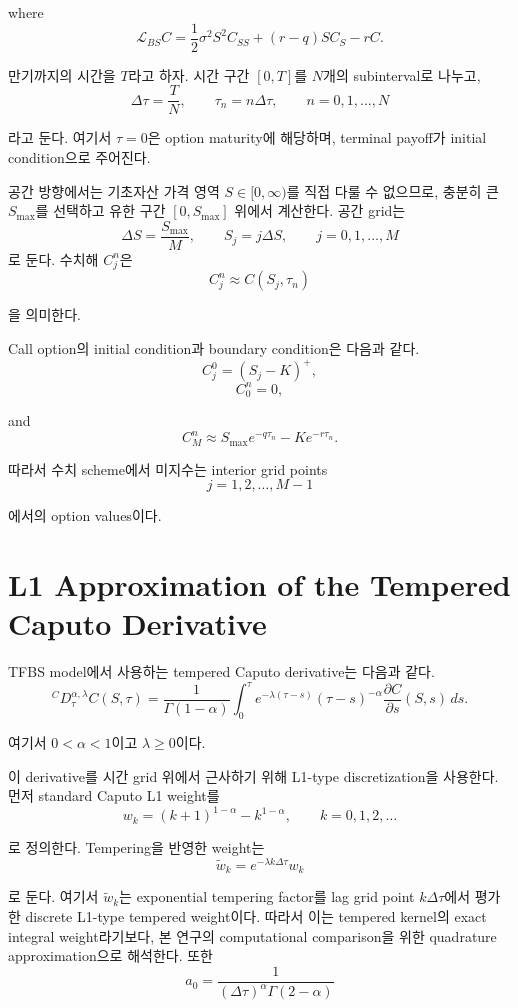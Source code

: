 \documentclass[11pt,a4paper]{report}
\begin{document}
where
\[
\mathcal{L}_{BS}C
=
\frac{1}{2}\sigma^2S^2C_{SS}
+
(r-q)SC_S
-
rC.
\]

만기까지의 시간을 $T$라고 하자. 시간 구간 $[0,T]$를 $N$개의 subinterval로 나누고,
\[
\Delta \tau = \frac{T}{N},
\qquad
\tau_n = n\Delta \tau,
\qquad n=0,1,\dots,N
\]

라고 둔다. 여기서 $\tau=0$은 option maturity에 해당하며, terminal payoff가 initial condition으로 주어진다.

공간 방향에서는 기초자산 가격 영역 $S\in[0,\infty)$를 직접 다룰 수 없으므로, 충분히 큰 $S_{\max}$를 선택하고 유한 구간 $[0,S_{\max}]$ 위에서 계산한다. 공간 grid는
\[
\Delta S = \frac{S_{\max}}{M},
\qquad
S_j=j\Delta S,
\qquad j=0,1,\dots,M
\]
로 둔다. 수치해 $C_j^n$은
\[
C_j^n \approx C(S_j,\tau_n)
\]

을 의미한다.

Call option의 initial condition과 boundary condition은 다음과 같다.
\[
C_j^0=(S_j-K)^+,
\]
\[
C_0^n=0,
\]

and
\[
C_M^n
\approx
S_{\max}e^{-q\tau_n}
-
Ke^{-r\tau_n}.
\]

따라서 수치 scheme에서 미지수는 interior grid points
\[
j=1,2,\dots,M-1
\]

에서의 option values이다.

\section{L1 Approximation of the Tempered Caputo Derivative}

TFBS model에서 사용하는 tempered Caputo derivative는 다음과 같다.
\[
{}^C D_\tau^{\alpha,\lambda} C(S,\tau)
=
\frac{1}{\Gamma(1-\alpha)}
\int_0^\tau
e^{-\lambda(\tau-s)}
(\tau-s)^{-\alpha}
\frac{\partial C}{\partial s}(S,s)\,ds.
\]

여기서 $0<\alpha<1$이고 $\lambda\ge0$이다.

이 derivative를 시간 grid 위에서 근사하기 위해 L1-type discretization을 사용한다. 먼저 standard Caputo L1 weight를
\[
w_k
=
(k+1)^{1-\alpha}-k^{1-\alpha},
\qquad k=0,1,2,\dots
\]

로 정의한다. Tempering을 반영한 weight는
\[
\widetilde w_k
=
e^{-\lambda k\Delta\tau}w_k
\]

로 둔다. 여기서 $\widetilde w_k$는 exponential tempering factor를 lag grid point $k\Delta\tau$에서 평가한 discrete L1-type tempered weight이다. 따라서 이는 tempered kernel의 exact integral weight라기보다, 본 연구의 computational comparison을 위한 quadrature approximation으로 해석한다. 또한
\[
a_0
=
\frac{1}{(\Delta\tau)^\alpha\Gamma(2-\alpha)}
\]
\end{document}
